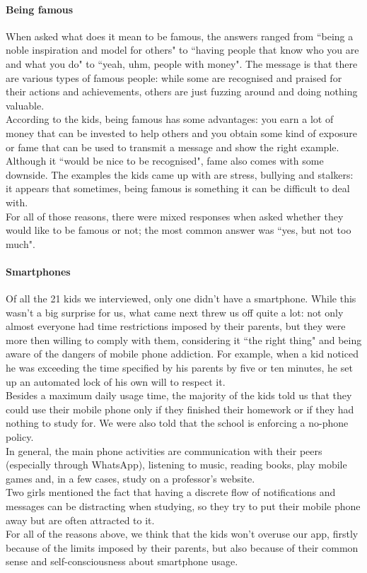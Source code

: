 \documentclass[12pt]{scrartcl}
\begin{document}
		\paragraph{Being famous} When asked what does it mean to be famous, the answers ranged from ``being a noble inspiration and model for others" to ``having people that know who you are and what you do" to ``yeah, uhm, people with money". The message is that there are various types of famous people: while some are recognised and praised for their actions and achievements, others are just fuzzing around and doing nothing valuable.\\
		According to the kids, being famous has some advantages: you earn a lot of money that can be invested to help others and you obtain some kind of exposure or fame that can be used to transmit a message and show the right example. Although it ``would be nice to be recognised", fame also comes with some downside. The examples the kids came up with are stress, bullying and stalkers: it appears that sometimes, being famous is something it can be difficult to deal with.\\
		For all of those reasons, there were mixed responses when asked whether they would like to be famous or not; the most common answer was ``yes, but not too much".
		
		\paragraph{Smartphones} Of all the 21 kids we interviewed, only one didn't have a smartphone. While this wasn't a big surprise for us, what came next threw us off quite a lot: not only almost everyone had time restrictions imposed by their parents, but they were more then willing to comply with them, considering it ``the right thing" and being aware of the dangers of mobile phone addiction. For example, when a kid noticed he was exceeding the time specified by his parents by five or ten minutes, he set up an automated lock of his own will to respect it.\\
		Besides a maximum daily usage time, the majority of the kids told us that they could use their mobile phone only if they finished their homework or if they had nothing to study for. We were also told that the school is enforcing a no-phone policy.\\
		In general, the main phone activities are communication with their peers (especially through WhatsApp), listening to music, reading books, play mobile games and, in a few cases, study on a professor's website.\\
		Two girls mentioned the fact that having a discrete flow of notifications and messages can be distracting when studying, so they try to put their mobile phone away but are often attracted to it.\\
		For all of the reasons above, we think that the kids won't overuse our app, firstly because of the limits imposed by their parents, but also because of their common sense and self-consciousness about smartphone usage.
		
\end{document}
